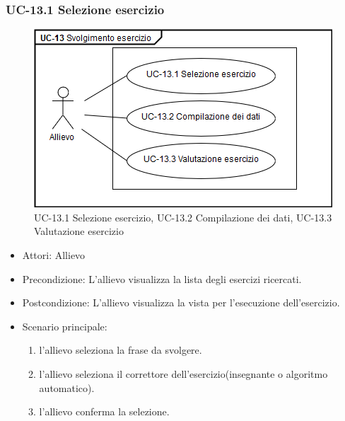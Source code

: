 	\subsubsection{UC-13.1 Selezione esercizio}
	\begin{figure}[h]
			\centering
			\includegraphics[scale=0.7]{images/UC-13_1.png}
			\caption{UC-13.1 Selezione esercizio, UC-13.2 Compilazione dei dati, UC-13.3 Valutazione esercizio}
	\end{figure}
	\begin{itemize}
			\item Attori: Allievo
			\item Precondizione: L'allievo visualizza la lista degli esercizi ricercati.
			\item Postcondizione: L'allievo visualizza la vista per l'esecuzione dell'esercizio.
			\item Scenario principale:
				\begin{enumerate}
					\item l'allievo seleziona la frase da svolgere.
					\item l'allievo seleziona il correttore dell'esercizio(insegnante o algoritmo automatico).
					\item l'allievo conferma la selezione.
				\end{enumerate}
			\end{itemize}

